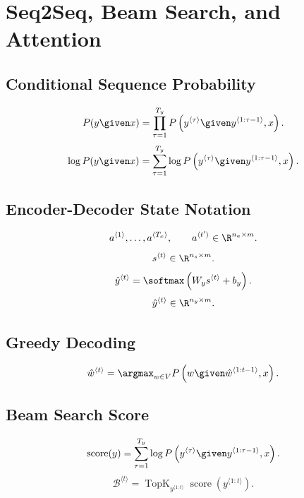 \section{Seq2Seq, Beam Search, and Attention}

\subsection{Conditional Sequence Probability}

\[
P(y \given x)
=
\prod_{\tau=1}^{T_y}
P
\left(
y^{\langle \tau\rangle}
\given
y^{\langle 1:\tau-1\rangle},
x
\right).
\]
\[
\log P(y \given x)
=
\sum_{\tau=1}^{T_y}
\log
P
\left(
y^{\langle \tau\rangle}
\given
y^{\langle 1:\tau-1\rangle},
x
\right).
\]

\subsection{Encoder-Decoder State Notation}

\[
a^{\langle 1\rangle},\dots,a^{\langle T_x\rangle},
\qquad
a^{\langle t'\rangle}
\in
\R^{n_a \times m}.
\]
\[
s^{\langle t\rangle}
\in
\R^{n_s \times m}.
\]
\[
\hat{y}^{\langle t\rangle}
=
\softmax
\left(
W_y s^{\langle t\rangle}
+
b_y
\right).
\]
\[
\hat{y}^{\langle t\rangle}
\in
\R^{n_y \times m}.
\]

\subsection{Greedy Decoding}

\[
\hat{w}^{\langle t\rangle}
=
\argmax_{w \in V}
P
\left(
w
\given
\hat{w}^{\langle 1:t-1\rangle},
x
\right).
\]

\subsection{Beam Search Score}

\[
\operatorname{score}(y)
=
\sum_{\tau=1}^{T_y}
\log
P
\left(
y^{\langle \tau\rangle}
\given
y^{\langle 1:\tau-1\rangle},
x
\right).
\]
\[
\mathcal{B}^{\langle t\rangle}
=
\operatorname{TopK}_{y^{\langle 1:t\rangle}}
\operatorname{score}
\left(
y^{\langle 1:t\rangle}
\right).
\]

